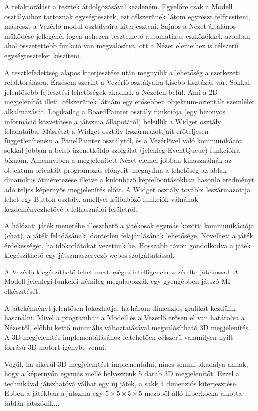 \documentclass[12pt, twoside]{report}
\begin{document}
A refaktorálást a tesztek átdolgozásával kezdeném. Egyelőre csak a Modell osztályaihoz tartoznak egységtesztek, ezt célszerűnek látom egyrészt felfrissíteni, másrészt a Vezérlő modul osztályaira kiterjeszteni. Sajnos a Nézet általános működése jellegénél fogva nehezen tesztelhető automatikus eszközökkel, azonban ahol összetettebb funkció van megvalósítva, ott a Nézet elemeihez is célszerű egységteszteket készíteni.

A tesztlefedettség alapos kiterjesztése után megnyílik a lehetőség a szerkezeti refaktorálásra. Érzésem szerint a Vezérlő osztályaira kisebb tisztázás vár. Sokkal jelentősebb fejlesztési lehetőségek akadnak a Nézeten belül. Ami a 2D megjelenítőt illeti, célszerűnek látnám egy erősebben objektum-orientált szemlélet alkalmazását. Logikailag a BoardPainter osztály funkciója (egy bizonyos információ közvetítése a játszma állapotáról) beleillik a Widget osztály feladataiba. Másrészt a Widget osztály leszármazottjait erőteljesen függetleníteném a PanelPainter osztálytól, és a Vezérlővel való kommunikácót sokkal jobban a belső üzenetküldő szolgálat (jelenleg EventQueue) funkcióira bíznám. Amennyiben a megjelenített Nézet elemei jobban kihasználnák az objektum-orientált programozás előnyeit, megnyílna a lehetőség az ablak dinamikus átméretezése illetve a különböző képfelbontásokban hasonló eredményt adó teljes képernyős megjelenítés előtt. A Widget osztály további leszármazottja lehet egy Button osztály, amellyel különböző funkciók válnának kezdeményezhetővé a felhasználói felületről.

A hálózati játék menetébe illeszthető a játékosok egymás közötti kommunikációja (chat), a játék feladásának, döntetlen felajánlásának lehetősége. Növelheti a játék érdekességét, ha időkorlátokat vezetünk be. Hosszabb távon gondolkodva a játék kiegészíthető egy játszmaszervező webes szolgáltatással.

A Vezérlő kiegészíthető lehet mesterséges intelligencia vezérelte játékossal. A Modell jelenlegi funkciói némileg megalapozzák egy gyengébben játszó MI elkészítését.

A játékélményt jelentősen fokozhatja, ha három dimenziós grafikát kezdünk használni. Mivel a programban a Modell és a Vezérlő erősen el van határolva a Nézettől, előbbi kettő minimális változtatásával megvalósítható 3D megjelenítés. A 3D megjelenítés implementálásához feltehetően célszerű valamilyen nyílt forrású 3D motort igénybe venni.

Végül, ha sikerül 3D megjelenítést implementálni, nincs semmi akadálya annak, hogy a képernyőn egymás mellé helyezzünk 5 darab 3D megjelenítőt. Ezzel a technikával játszhatóvá válhat egy új játék, a sakk 4 dimenziós kiterjesztése. Ebben a játékban a játszma egy $5 \times 5 \times 5 \times 5$ mezőből álló hiperkocka alkotta táblán játszódik... 
\end{document}
